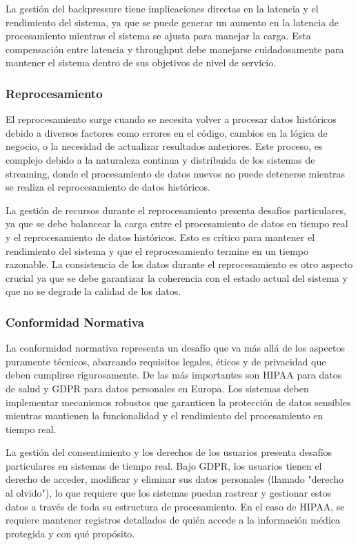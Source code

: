 La gestión del backpressure tiene implicaciones directas en la latencia y el rendimiento del sistema, 
ya que se puede generar un aumento en la latencia de procesamiento mientras el sistema se ajusta para manejar la carga. 
Esta compensación entre latencia y throughput debe manejarse cuidadosamente para mantener el sistema dentro de sus objetivos de nivel de servicio.

\subsubsection{Reprocesamiento}

El reprocesamiento surge cuando se necesita volver a procesar datos históricos debido a diversos factores como errores en el código, cambios en la lógica de negocio, o la necesidad de actualizar resultados anteriores.
Este proceso, es complejo debido a la naturaleza continua y distribuida de los sistemas de streaming, donde el procesamiento de datos nuevos no puede detenerse mientras se realiza el reprocesamiento de datos históricos.

La gestión de recursos durante el reprocesamiento presenta desafíos particulares, ya que se debe balancear la carga entre el procesamiento de datos en tiempo real y el reprocesamiento de datos históricos. 
Esto es crítico para mantener el rendimiento del sistema y que el reprocesamiento termine en un tiempo razonable.
La consistencia de los datos durante el reprocesamiento es otro aspecto crucial ya que se debe garantizar la coherencia con el estado actual del sistema y que no se degrade la calidad de los datos. 

\subsubsection{Conformidad Normativa}

La conformidad normativa representa un desafío que va más allá de los aspectos puramente técnicos, abarcando requisitos legales, éticos y de privacidad que deben cumplirse rigurosamente. 
De las más importantes son HIPAA para datos de salud y GDPR para datos personales en Europa. 
Los sistemas deben implementar mecanismos robustos que garanticen la protección de datos sensibles mientras mantienen la funcionalidad y el rendimiento del procesamiento en tiempo real.

La gestión del consentimiento y los derechos de los usuarios presenta desafíos particulares en sistemas de tiempo real. 
Bajo GDPR, los usuarios tienen el derecho de acceder, modificar y eliminar sus datos personales (llamado "derecho al olvido"), 
lo que requiere que los sistemas puedan rastrear y gestionar estos datos a través de toda su estructura de procesamiento. 
En el caso de HIPAA, se requiere mantener registros detallados de quién accede a la información médica protegida y con qué propósito.

